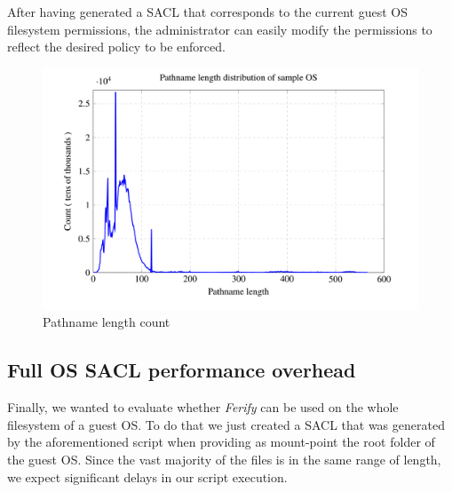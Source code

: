 \par After having generated a \ac{SACL} that corresponds to the current guest \ac{OS} filesystem permissions, the administrator can easily modify the permissions to reflect the desired policy to be enforced. 

\begin{figure}[ht]
	\centering
	\includegraphics[scale=0.45]{images/graph1.png}
	\caption{Pathname length count}
	\label{fig:pathname_length}
\end{figure}


\subsection{Full \ac{OS} \ac{SACL} performance overhead}

\par Finally, we wanted to evaluate whether \emph{Ferify} can be used on the whole filesystem of a guest \ac{OS}. To do that we just created a \ac{SACL} that was generated by the aforementioned script when providing as mount-point the root folder of the guest \ac{OS}. Since the vast majority of the files is in the same range of length, we expect significant delays in our script execution.




